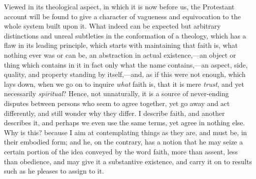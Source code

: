 Viewed in its theological aspect, in which it is now before us, the
Protestant account will be found to give a character of vagueness and
equivocation to the whole system built upon it. What indeed can be
expected but arbitrary distinctions and unreal subtleties in the
conformation of a theology, which has a flaw in its leading principle,
which starts with maintaining that faith is, what nothing ever was or
can be, an abstraction in actual existence,—an object or thing which
contains in it in fact only what the name contains,—an aspect, side,
quality, and property standing by itself,—and, as if this were not
enough, which lays down, when we go on to inquire \emph{what} faith
is, that it is mere \emph{trust}, and yet necessarily \emph{spiritual}?
Hence, not unnaturally, it is a source of never-ending disputes
between persons who seem to agree together, yet go away and act
differently, and still wonder why they differ. I describe faith, and
another describes it, and perhaps we even use the same terms, yet
agree in nothing else. Why is this? because I aim at contemplating
things as they are, and must be, in their embodied form; and he, on
the contrary, has a notion that he may seize a certain portion of the
idea conveyed by the word faith, more than assent, less than
obedience, and may give it a substantive existence, and carry it on to
results such as he pleases to assign to it.

